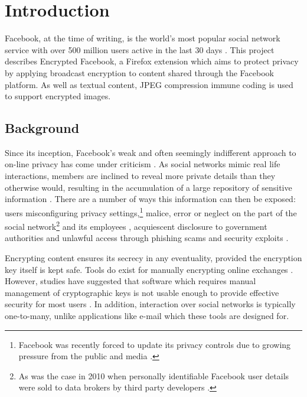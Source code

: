 \chapter{Introduction}\label{ch:introduction}

Facebook, at the time of writing, is the world's most popular social network service with over 500 million users active in the last 30 days \cite{fb-factsheet}. This project describes Encrypted Facebook, a Firefox extension which aims to protect privacy by applying broadcast encryption to content shared through the Facebook platform. As well as textual content, JPEG compression immune coding is used to support encrypted images.

\section{Background}
\label{sec:background}

Since its inception, Facebook's weak and often seemingly indifferent approach to on-line privacy has come under criticism \cite{fb-cipc}. As social networks mimic real life interactions, members are inclined to reveal more private details than they otherwise would, resulting in the accumulation of a large repository of sensitive information \cite{gross}. There are a number of ways this information can then be exposed: users misconfiguring privacy settings,\footnote{Facebook was recently forced to update its privacy controls due to growing pressure from the public and media \cite{fb-priv}.} malice, error or neglect on the part of the social network\footnote{As was the case in 2010 when personally identifiable Facebook user details were sold to data brokers by third party developers \cite{fb-ids}.} and its employees \cite{snoop}, acquiescent disclosure to government authorities \cite{fb-gov} and unlawful access through phishing scams \cite{fb-phish} and security exploits \cite{rockyou}.

Encrypting content ensures its secrecy in any eventuality, provided the encryption key itself is kept safe. Tools do exist for manually encrypting online exchanges \cite{firegpg}. However, studies have suggested that software which requires manual management of cryptographic keys is not usable enough to provide effective security for most users \cite{johnny}. In addition, interaction over social networks is typically one-to-many, unlike applications like e-mail which these tools are designed for.

